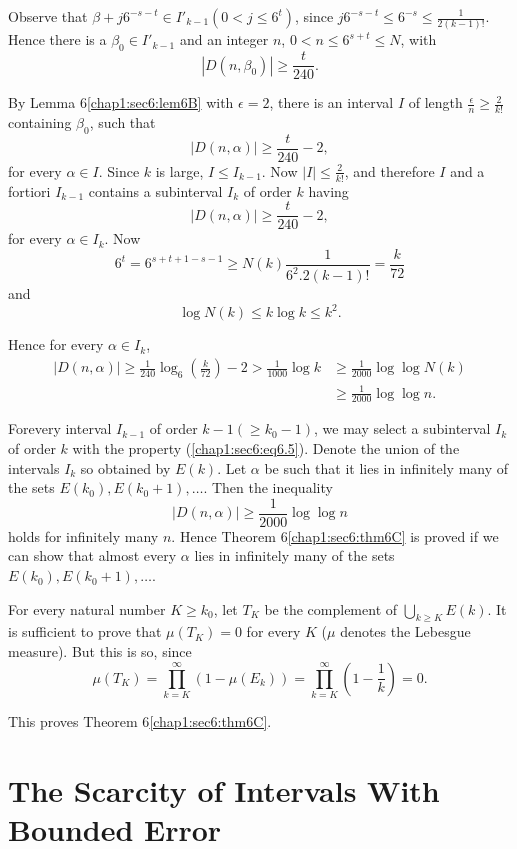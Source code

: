 Observe that $\beta + j 6^{-s-t} \in I'_{k-1} (0 < j \leq 6^{t})$, since $j 6^{-s-t} \leq 6^{-s} \leq \frac{1}{2(k-1)!}$. Hence there is a $\beta_{0} \in I'_{k-1}$ and an integer $n$, $0 < n \leq 6^{s+t} \leq N$, with
$$
|D(n, \beta_{0})| \geq \frac{t}{240}.
$$

By Lemma 6\ref{chap1:sec6:lem6B} with $\epsilon = 2$, there is an interval $I$ of length $\frac{\epsilon}{n} \geq \frac{2}{k!}$ containing $\beta_{0}$, such that
$$
|D(n, \alpha)| \geq \frac{t}{240} - 2,
$$
for every $\alpha \in I$. Since $k$ is large, $I \leq I_{k-1}$. Now $|I| \leq \frac{2}{k!}$, and therefore $I$ and a fortiori $I_{k-1}$ contains a subinterval $I_{k}$ of order $k$ having 
$$
|D(n, \alpha)| \geq \frac{t}{240} - 2,
$$
for every $\alpha \in I_{k}$. Now
$$
6^{t} = 6^{s+t+1-s-1} \geq N(k) \frac{1}{6^{2} . 2(k-1)!} = \frac{k}{72}
$$
and
$$
\log N(k) \leq k \log k \leq k^{2}.
$$

Hence for every $\alpha \in I_{k}$,
\begin{align*}
|D(n, \alpha)| \geq \frac{1}{240} \log_{6} (\frac{k}{72}) - 2 > \frac{1}{1000} \log k & \geq \frac{1}{2000} \log \log N(k)\tag{6.5}\label{chap1:sec6:eq6.5}\\
& \geq \frac{1}{2000} \log \log n.
\end{align*}

For\pageoriginale every interval $I_{k-1}$ of order $k-1 (\geq k_{0} - 1)$, we may select a subinterval $I_{k}$ of order $k$ with the property (\ref{chap1:sec6:eq6.5}). Denote the union of the intervals $I_{k}$ so obtained by $E(k)$. Let $\alpha$ be such that it lies in infinitely many of the sets $E(k_{0}), E(k_{0} + 1), \ldots$. Then the inequality
$$
|D(n, \alpha)| \geq \frac{1}{2000} \log \log n
$$
holds for infinitely many $n$. Hence Theorem 6\ref{chap1:sec6:thm6C} is proved if we can show that almost every $\alpha$ lies in infinitely many of the sets $E(k_{0}), E(k_{0} + 1), \ldots$.

For every natural number $K \geq k_{0}$, let $T_{K}$ be the complement of $\bigcup\limits_{k \geq K} E(k)$. It is sufficient to prove that $\mu (T_{K}) = 0$ for every $K$ ($\mu$ denotes the Lebesgue measure). But this is so, since
$$
\mu (T_{K}) = \prod_{k=K}^{\infty} (1-\mu(E_{k}))=\prod_{k=K}^{\infty}(1-\frac{1}{k}) = 0.
$$

This proves Theorem 6\ref{chap1:sec6:thm6C}.

\section{The Scarcity of Intervals With Bounded Error}\label{chap1:sec7} 

